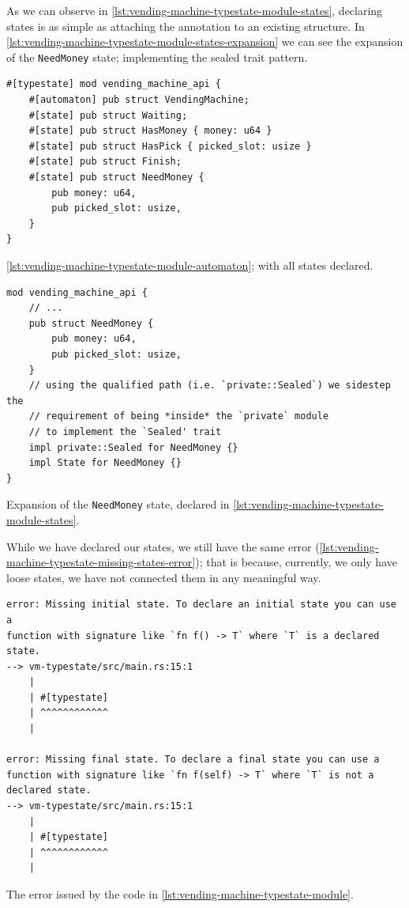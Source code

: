 As we can observe in \autoref{lst:vending-machine-typestate-module-states},
declaring states is as simple as attaching the annotation to an existing structure.
In \autoref{lst:vending-machine-typestate-module-states-expansion} we can see the expansion of the \texttt{NeedMoney} state;
implementing the sealed trait pattern.

\begin{listing}
    \begin{verbatim}
#[typestate] mod vending_machine_api {
    #[automaton] pub struct VendingMachine;
    #[state] pub struct Waiting;
    #[state] pub struct HasMoney { money: u64 }
    #[state] pub struct HasPick { picked_slot: usize }
    #[state] pub struct Finish;
    #[state] pub struct NeedMoney {
        pub money: u64,
        pub picked_slot: usize,
    }
}
    \end{verbatim}
    \caption{\autoref{lst:vending-machine-typestate-module-automaton}; with all states declared.}
    \label{lst:vending-machine-typestate-module-states}
\end{listing}

\begin{listing}
    \begin{verbatim}
mod vending_machine_api {
    // ...
    pub struct NeedMoney {
        pub money: u64,
        pub picked_slot: usize,
    }
    // using the qualified path (i.e. `private::Sealed`) we sidestep the
    // requirement of being *inside* the `private` module
    // to implement the `Sealed' trait
    impl private::Sealed for NeedMoney {}
    impl State for NeedMoney {}
}
    \end{verbatim}
    \caption{Expansion of the \texttt{NeedMoney} state, declared in \autoref{lst:vending-machine-typestate-module-states}.}
    \label{lst:vending-machine-typestate-module-states-expansion}
\end{listing}

While we have declared our states, we still have the same error (\autoref{lst:vending-machine-typestate-missing-states-error});
that is because, currently, we only have loose states, we have not connected them in any meaningful way.

\begin{listing}
    \begin{verbatim}
error: Missing initial state. To declare an initial state you can use a
function with signature like `fn f() -> T` where `T` is a declared state.
--> vm-typestate/src/main.rs:15:1
    |
    | #[typestate]
    | ^^^^^^^^^^^^
    |

error: Missing final state. To declare a final state you can use a
function with signature like `fn f(self) -> T` where `T` is not a declared state.
--> vm-typestate/src/main.rs:15:1
    |
    | #[typestate]
    | ^^^^^^^^^^^^
    |
    \end{verbatim}
    \caption{The error issued by the code in \autoref{lst:vending-machine-typestate-module}.}
    \label{lst:vending-machine-typestate-missing-states-error}
\end{listing}


